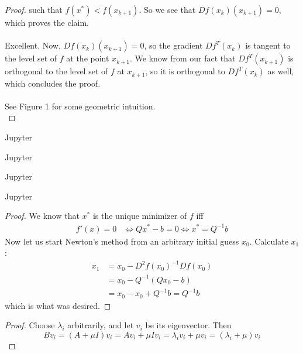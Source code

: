 \documentclass[12pt]{article}
\newenvironment{problem}[2][Problem]{\begin{trivlist}
\item[\hskip \labelsep {\bfseries #1}\hskip \labelsep {\bfseries #2.}]}{\end{trivlist}}
\theoremstyle{definition}
\theoremstyle{definition}
\theoremstyle{definition}
\theoremstyle{definition}
\begin{document}
\begin{problem}{9.5}
\begin{proof}
such that $f(x^*) < f(x_{k+1})$. So we see that $Df(x_k)(x_{k+1}) = 0$, which proves the claim. \\
\\
Excellent. Now, $Df(x_k)(x_{k+1}) = 0$, so the gradient $Df^T(x_k)$ is tangent to the level set of $f$ at the point $x_{k+1}$. We know from our fact that $Df^T(x_{k+1})$ is orthogonal to the level set of $f$ at $x_{k+1}$, so it is orthogonal to $Df^T(x_k)$ as well, which concludes the proof. \\
\\
See Figure 1  for some geometric intuition. \\
\end{proof}
\end{problem}

\begin{problem}{9.6}
Jupyter
\end{problem}

\begin{problem}{9.7}
Jupyter
\end{problem}

\begin{problem}{9.8}
Jupyter
\end{problem}

\begin{problem}{9.9}
Jupyter
\end{problem}

\begin{problem}{9.10} 
\begin{proof}
We know that $x^*$ is the unique minimizer of $f$ iff 
\begin{align*}
f'(x) = 0 &\iff Qx^* - b = 0 \iff x^* = Q^{-1}b 
\end{align*}
Now let us start Newton's method from an arbitrary initial guess $x_0$. Calculate $x_1$:
\begin{align*}
x_1 &= x_0 - D^2f(x_0)^{-1}Df(x_0) \\
&= x_0 - Q^{-1} (Qx_0 - b) \\
&= x_0 - x_0 + Q^{-1}b = Q^{-1}b
\end{align*}
which is what was desired.
\end{proof}
\end{problem}

\begin{problem}{9.12}
\begin{proof}
Choose $\lambda_i$ arbitrarily, and let $v_i$ be its eigenvector. Then
$$
Bv_i = (A + \mu I)v_i = Av_i + \mu I v_i = \lambda_i v_i + \mu v_i = (\lambda_i + \mu) v_i
$$
\end{proof}
\end{problem}
\end{document}
